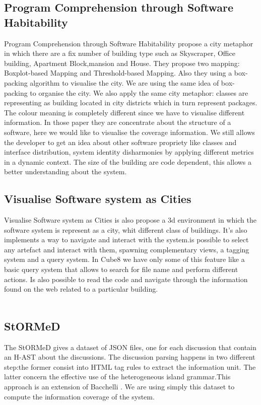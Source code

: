 \documentclass[]{usiinfbachelorproject}
\begin{document}
\subsection{Program Comprehension through Software Habitability}
Program Comprehension through Software Habitability \cite{programComp} propose a city metaphor in which there are a fix number  of building type such as Skyscraper, Office building, Apartment Block,mansion and House. They propose two mapping: Boxplot-based Mapping and Threshold-based Mapping. Also they using a box-packing algorithm to visualise the city.  We are using the same idea of box-packing to organise the city. We also apply the same city metaphor: classes are representing as building located in city districts which in turn represent packages. \\The colour meaning is completely different since we have to visualise different information. In those paper they are concentrate about the structure of a software, here we would like to visualise the coverage information. We still allows the developer to get an idea about other software propriety like classes and interface distribution, system identity disharmonies by  applying different metrics in a dynamic context. The size of the building are code dependent, this allows a better understanding about the system. 

\subsection{Visualise Software system as Cities}
Visualise Software system as Cities \cite{vssac} is also propose a 3d environment in which the software system is represent as a city, whit different class of buildings. It's also implements a way to navigate and interact with the system.is possible to select any artefact and interact with them, spawning complementary views,  a tagging system and a query system.
In Cube8 we have only some of this feature like a basic query system that allows to search for  file name and perform different actions. Is also possible to read the code and navigate through the information found on the web related to a particular building.\\ \\

\subsection{StORMeD}
The StORMeD \cite{stormy} gives a dataset of JSON files, one for each discussion that contain an H-AST about the discussions. The discussion parsing happens in two different step:the former consist into  HTML tag rules to extract the information unit. The latter concern the effective use of the  heterogeneous island grammar.This approach is an extension of Bacchelli \cite{Bacchelli}.  
We are using simply this dataset to compute the information coverage of the system.
\end{document}
